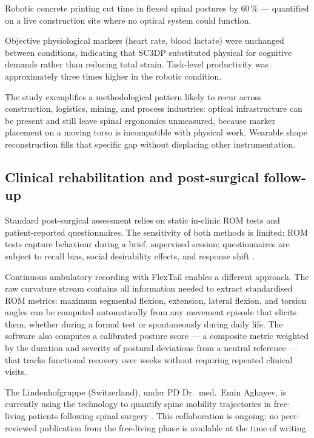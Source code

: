\begin{factboxfire}
    Robotic concrete printing cut time in flexed spinal postures by 60\,\% ---
    quantified on a live construction site where no optical system could function.
\end{factboxfire}

Objective physiological markers (heart rate, blood lactate) were unchanged between
conditions, indicating that SC3DP substituted physical for cognitive demands rather
than reducing total strain.
Task-level productivity was approximately three times higher in the robotic condition.

The study exemplifies a methodological pattern likely to recur across construction,
logistics, mining, and process industries: optical infrastructure can be present and
still leave spinal ergonomics unmeasured, because marker placement on a moving torso
is incompatible with physical work.
Wearable shape reconstruction fills that specific gap without displacing other
instrumentation.

\subsection{Clinical rehabilitation and post-surgical follow-up}

Standard post-surgical assessment relies on static in-clinic \acs{ROM} tests and
patient-reported questionnaires.
The sensitivity of both methods is limited: ROM tests capture behaviour during a brief,
supervised session; questionnaires are subject to recall bias, social desirability
effects, and response shift \cite{natarajan2023}.

Continuous ambulatory recording with FlexTail enables a different approach.
The raw curvature stream contains all information needed to extract standardised ROM
metrics: maximum segmental flexion, extension, lateral flexion, and torsion angles can
be computed automatically from any movement episode that elicits them, whether during
a formal test or spontaneously during daily life.
The software also computes a calibrated posture score --- a composite metric weighted
by the duration and severity of postural deviations from a neutral reference --- that
tracks functional recovery over weeks without requiring repeated clinical visits.

The Lindenhofgruppe (Switzerland), under PD Dr.\ med.\ Emin Aghayev, is currently
using the technology to quantify spine mobility trajectories in free-living patients
following spinal surgery \cite{marx2023}.
This collaboration is ongoing; no peer-reviewed publication from the free-living phase
is available at the time of writing.

